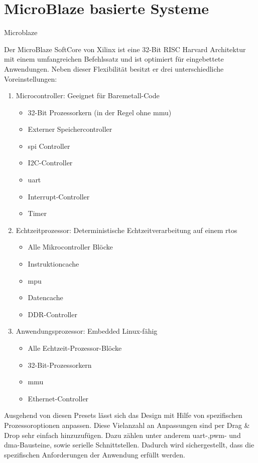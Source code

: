 \section{MicroBlaze basierte Systeme}\label{kap:microblaze}
Microblaze

Der MicroBlaze SoftCore von Xilinx ist eine 32-Bit RISC Harvard Architektur mit einem umfangreichen Befehlssatz und ist optimiert für eingebettete Anwendungen.
Neben dieser Flexibilität besitzt er drei unterschiedliche Voreinstellungen:

\begin{enumerate}
  \item Microcontroller: Geeignet für Baremetall-Code
        \begin{itemize}
          \item 32-Bit Prozessorkern (in der Regel ohne \ac{mmu})
          \item Externer Speichercontroller
          \item \ac{spi} Controller
          \item I2C-Controller
          \item \ac{uart}
          \item Interrupt-Controller
          \item  Timer
        \end{itemize}
  \item Echtzeitprozessor: Deterministische Echtzeitverarbeitung auf einem \ac{rtos}
    \begin{itemize}
      \item Alle Mikrocontroller Blöcke
      \item Instruktioncache
      \item \ac{mpu}
      \item Datencache
      \item DDR-Controller
      \end{itemize}
  \item Anwendungsprozessor: Embedded Linux-fähig
        \begin{itemize}
          \item Alle Echtzeit-Prozessor-Blöcke
          \item 32-Bit-Prozessorkern
          \item \ac{mmu}
          \item Ethernet-Controller
        \end{itemize}
\end{enumerate}

Ausgehend von diesen Presets lässt sich das Design mit Hilfe von spezifischen Prozessoroptionen anpassen.
 Diese Vielanzahl an Anpassungen sind per Drag \& Drop sehr einfach hinzuzufügen. Dazu zählen unter anderem \ac{uart}-,\ac{pwm}- und \ac{dma}-Bausteine, sowie serielle Schnittstellen.
 Dadurch wird sichergestellt, dass die spezifischen Anforderungen der Anwendung erfüllt werden.

